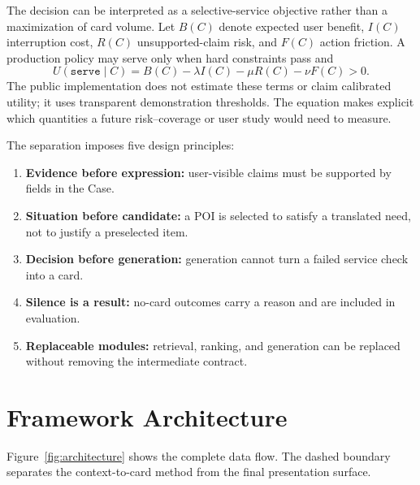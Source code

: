 \documentclass[10pt]{article}
\newcommand{\serve}{\texttt{serve}}
\begin{document}
The decision can be interpreted as a selective-service objective rather than a maximization of card volume. Let $B(C)$ denote expected user benefit, $I(C)$ interruption cost, $R(C)$ unsupported-claim risk, and $F(C)$ action friction. A production policy may serve only when hard constraints pass and
\begin{equation}
  U(\serve\mid C)=B(C)-\lambda I(C)-\mu R(C)-\nu F(C)>0.
\end{equation}
The public implementation does not estimate these terms or claim calibrated utility; it uses transparent demonstration thresholds. The equation makes explicit which quantities a future risk--coverage or user study would need to measure.

The separation imposes five design principles:
\begin{enumerate}
  \item \textbf{Evidence before expression:} user-visible claims must be supported by fields in the Case.
  \item \textbf{Situation before candidate:} a POI is selected to satisfy a translated need, not to justify a preselected item.
  \item \textbf{Decision before generation:} generation cannot turn a failed service check into a card.
  \item \textbf{Silence is a result:} no-card outcomes carry a reason and are included in evaluation.
  \item \textbf{Replaceable modules:} retrieval, ranking, and generation can be replaced without removing the intermediate contract.
\end{enumerate}

\section{Framework Architecture}

Figure~\ref{fig:architecture} shows the complete data flow. The dashed boundary separates the context-to-card method from the final presentation surface.
\end{document}
